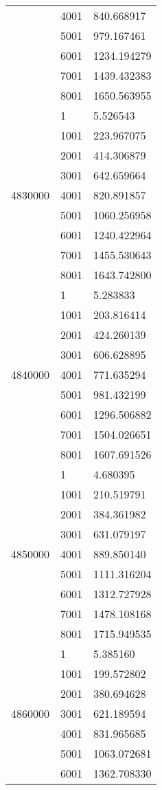 \begin{table}[htb!]
\begin{tabular}{lll}
 & 4001 & 840.668917 \\
 & 5001 & 979.167461 \\
 & 6001 & 1234.194279 \\
 & 7001 & 1439.432383 \\
 & 8001 & 1650.563955 \\
\multirow[c]{9}{*}{4830000} & 1 & 5.526543 \\
 & 1001 & 223.967075 \\
 & 2001 & 414.306879 \\
 & 3001 & 642.659664 \\
 & 4001 & 820.891857 \\
 & 5001 & 1060.256958 \\
 & 6001 & 1240.422964 \\
 & 7001 & 1455.530643 \\
 & 8001 & 1643.742800 \\
\multirow[c]{9}{*}{4840000} & 1 & 5.283833 \\
 & 1001 & 203.816414 \\
 & 2001 & 424.260139 \\
 & 3001 & 606.628895 \\
 & 4001 & 771.635294 \\
 & 5001 & 981.432199 \\
 & 6001 & 1296.506882 \\
 & 7001 & 1504.026651 \\
 & 8001 & 1607.691526 \\
\multirow[c]{9}{*}{4850000} & 1 & 4.680395 \\
 & 1001 & 210.519791 \\
 & 2001 & 384.361982 \\
 & 3001 & 631.079197 \\
 & 4001 & 889.850140 \\
 & 5001 & 1111.316204 \\
 & 6001 & 1312.727928 \\
 & 7001 & 1478.108168 \\
 & 8001 & 1715.949535 \\
\multirow[c]{9}{*}{4860000} & 1 & 5.385160 \\
 & 1001 & 199.572802 \\
 & 2001 & 380.694628 \\
 & 3001 & 621.189594 \\
 & 4001 & 831.965685 \\
 & 5001 & 1063.072681 \\
 & 6001 & 1362.708330 \\

\end{tabular}
\end{table}
